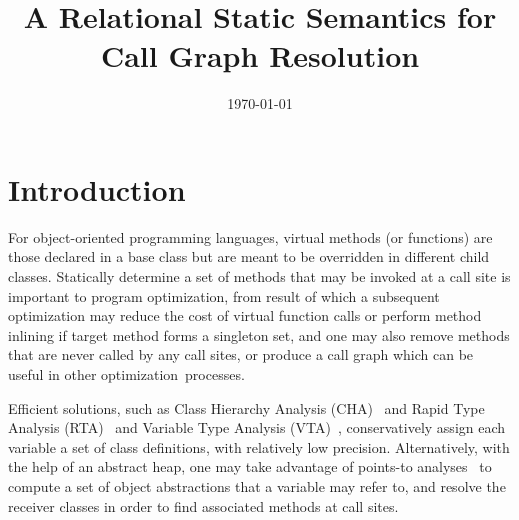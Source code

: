 \documentclass{llncs}
\title{A Relational Static Semantics for Call Graph Resolution}
\author{\today}
\institute{Jinan University}
\begin{document}
\maketitle


\section{Introduction}\label{sec:introduction}

For object-oriented programming languages, virtual methods (or functions) are those declared in a base class but are meant to be overridden in different child classes. Statically determine a set of methods that may be invoked at a call site is important to program optimization, from result of which a subsequent optimization may reduce the cost of virtual function calls or perform method inlining if target method forms a singleton set, and one may also remove methods that are never called by any call sites, or produce a call graph which can be useful in other optimization~processes.

Efficient solutions, such as Class Hierarchy Analysis (CHA)~\cite{Dean1995,Fernandez1995} and Rapid Type Analysis (RTA)~\cite{Bacon1996} and Variable Type Analysis (VTA)~\cite{Sundaresan2000}, conservatively assign each variable a set of class definitions, with relatively low precision. Alternatively, with the help of an abstract heap, one may take advantage of points-to analyses~\cite{andersen94} to compute a set of object abstractions that a variable may refer to, and resolve the receiver classes in order to find associated methods at call sites.
\end{document}
